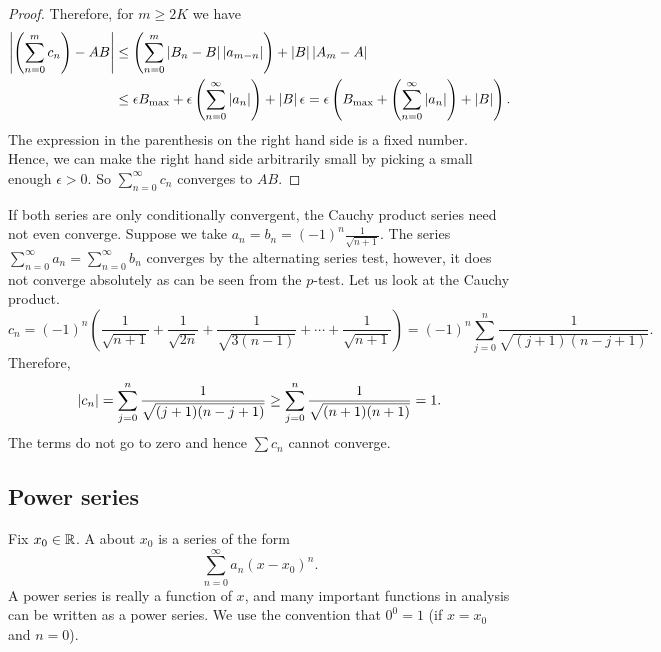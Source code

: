 \begin{proof}
Therefore, for $m \geq 2K$ we have
\begin{equation*}
\begin{split}
\left\lvert {\left(\sum_{n=0}^m c_n \right) - AB} \right\rvert
& \leq
\left(
\sum_{n=0}^m
  \left\lvert { B_n -  B } \right\rvert \left\lvert {a_{m-n}} \right\rvert
\right)
+
\left\lvert {B} \right\rvert\left\lvert {A_m - A} \right\rvert
\\
& \leq
\epsilon
B_{\text{max}}
+
\epsilon
\left(
\sum_{n=0}^\infty \left\lvert {a_{n}} \right\rvert
\right)
+
\left\lvert {B} \right\rvert\epsilon
=
\epsilon 
\left(
B_{\text{max}}
+
\left(
\sum_{n=0}^\infty \left\lvert {a_{n}} \right\rvert
\right)
+
\left\lvert {B} \right\rvert
\right) .
\end{split}
\end{equation*}
The expression in the parenthesis on the right hand side
is a fixed number.
Hence,
we can make the right hand side arbitrarily small by picking a small enough
$\epsilon> 0$.  So $\sum_{n=0}^\infty c_n$ converges to $AB$.
\end{proof}

\begin{example}
If both series are only conditionally convergent, the Cauchy product series
need not even converge.
Suppose we take $a_n = b_n = {(-1)}^n \frac{1}{\sqrt{n+1}}$.
The series $\sum_{n=0}^\infty a_n = \sum_{n=0}^\infty b_n$
converges
by the alternating series test, however, it does not converge
absolutely as can be seen from the $p$-test.  Let us look
at the Cauchy product.
\begin{equation*}
c_n = 
{(-1)}^n
\left(
\frac{1}{\sqrt{n+1}} + 
\frac{1}{\sqrt{2n}} + 
\frac{1}{\sqrt{3(n-1)}} + \cdots +
\frac{1}{\sqrt{n+1}}
\right)
=
{(-1)}^n
\sum_{j=0}^n \frac{1}{\sqrt{(j+1)(n-j+1)}} .
\end{equation*}
Therefore,
\begin{equation*}
\left\lvert {c_n} \right\rvert 
=
\sum_{j=0}^n \frac{1}{\sqrt{(j+1)(n-j+1)}} 
\geq
\sum_{j=0}^n \frac{1}{\sqrt{(n+1)(n+1)}} 
= 1 .
\end{equation*}
The terms do not go to zero and hence $\sum c_n$ cannot converge.
\end{example}

\subsection{Power series}

Fix $x_0 \in {\mathbb{R}}$.
A \emph{} about $x_0$
is a series of the form
\begin{equation*}
\sum_{n=0}^\infty a_n {(x-x_0)}^n .
\end{equation*}
A power series is really a function of $x$, and
many important functions in analysis can be written
as a power series.  We use the convention that
$0^0 = 1$ (if $x=x_0$ and $n=0$).

